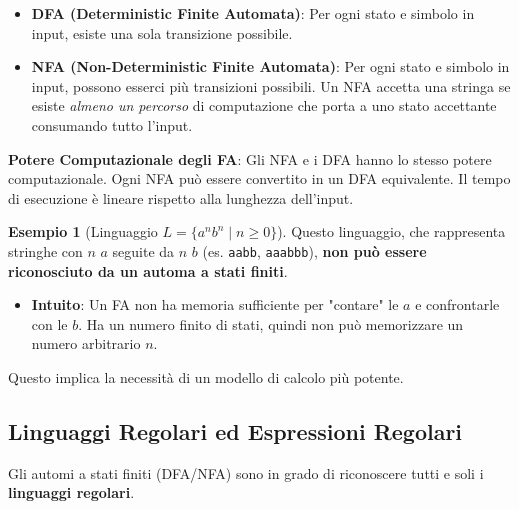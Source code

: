 \documentclass[a4paper]{article}
\theoremstyle{definition} %
\newtheorem{example}{Esempio}
\begin{document}
\begin{itemize}
    \item \textbf{DFA (Deterministic Finite Automata)}: Per ogni stato e simbolo in input, esiste una sola transizione possibile.
    \item \textbf{NFA (Non-Deterministic Finite Automata)}: Per ogni stato e simbolo in input, possono esserci più transizioni possibili. Un NFA accetta una stringa se esiste \emph{almeno un percorso} di computazione che porta a uno stato accettante consumando tutto l'input.
\end{itemize}

\textbf{Potere Computazionale degli FA}:
Gli NFA e i DFA hanno lo stesso potere computazionale. Ogni NFA può essere convertito in un DFA equivalente. Il tempo di esecuzione è lineare rispetto alla lunghezza dell'input.

\begin{example}[Linguaggio $L = \{a^n b^n \mid n \ge 0\}$]
    Questo linguaggio, che rappresenta stringhe con $n$ $a$ seguite da $n$ $b$ (es. \texttt{aabb}, \texttt{aaabbb}), \textbf{non può essere riconosciuto da un automa a stati finiti}.
    \begin{itemize}
        \item \textbf{Intuito}: Un FA non ha memoria sufficiente per "contare" le $a$ e confrontarle con le $b$. Ha un numero finito di stati, quindi non può memorizzare un numero arbitrario $n$.
    \end{itemize}
    Questo implica la necessità di un modello di calcolo più potente.
\end{example}

\subsection{Linguaggi Regolari ed Espressioni Regolari}
Gli automi a stati finiti (DFA/NFA) sono in grado di riconoscere tutti e soli i \textbf{linguaggi regolari}.
\end{document}
